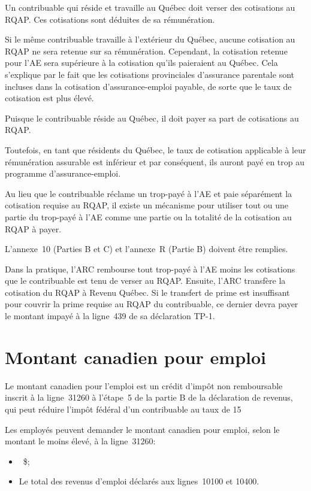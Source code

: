 Un contribuable qui réside et travaille au Québec doit verser des cotisations au RQAP. Ces cotisations sont déduites de sa rémunération. 

Si le même contribuable travaille à l'extérieur du Québec, aucune cotisation au RQAP ne sera retenue sur sa rémunération. Cependant, la cotisation retenue pour l'AE sera supérieure à la cotisation qu'ils paieraient au Québec. Cela s'explique par le fait que les cotisations provinciales d'assurance parentale sont incluses dans la cotisation d'assurance-emploi payable, de sorte que le taux de cotisation est plus élevé.

Puisque le contribuable réside au Québec, il doit payer sa part de cotisations au RQAP. 

Toutefois, en tant que résidents du Québec, le taux de cotisation applicable à leur rémunération assurable est inférieur et par conséquent, ils auront payé en trop au programme d'assurance-emploi.

Au lieu que le contribuable réclame un trop-payé à l'AE et paie séparément la cotisation requise au RQAP, il existe un mécanisme pour utiliser tout ou une partie du trop-payé à l'AE comme une partie ou la totalité de la cotisation au RQAP à payer.

L'annexe~10 (Parties B et C) et l'annexe~R (Partie B) doivent être remplies.

Dans la pratique, l'ARC rembourse tout trop-payé à l'AE moins les cotisations que le contribuable est tenu de verser au RQAP. Ensuite, l'ARC transfère la cotisation du RQAP à Revenu Québec. Si le transfert de prime est insuffisant pour couvrir la prime requise au RQAP du contribuable, ce dernier devra payer le montant impayé à la ligne~439 de sa déclaration TP-1.



\section{Montant canadien pour emploi}
\begin{intro}
	Le montant canadien pour l'emploi est un crédit d'impôt non remboursable inscrit à la ligne~31260 à l'étape~5 de la partie B de la déclaration de revenus, qui peut réduire l'impôt fédéral d'un contribuable au taux de 15 %
\end{intro}

Les employés peuvent demander le montant canadien pour emploi, selon le montant le moins élevé, à la ligne~31260:

\begin{itemize}
	\item {}~\$;
	\item Le total des revenus d'emploi déclarés aux lignes~10100 et 10400.
\end{itemize}

